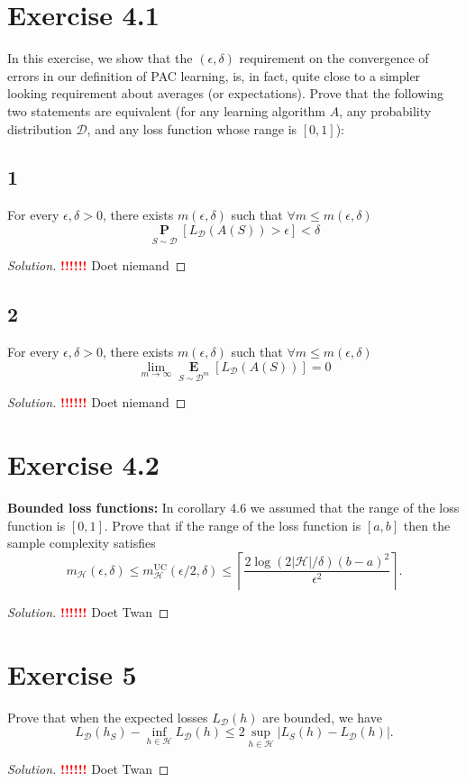 \documentclass[10pt, a4paper, twoside]{amsart}
\renewcommand{\P}{\operatorname*{\ensuremath{\mathbf{P}}}}
\newcommand{\Ev}{\operatorname*{\ensuremath{\mathbf{E}}}}
\newenvironment{solution}
               {\let\oldqedsymbol=\qedsymbol
                \renewcommand{\qedsymbol}{$\blacktriangleleft$}
                \begin{proof}[Solution]}
               {\end{proof}
                \renewcommand{\qedsymbol}{\oldqedsymbol}}
\newcommand{\TODO}{\textcolor{red}{\textbf{!!!!!! }}}
\begin{document}
\section*{Exercise 4.1}
In this exercise, we show that the $(\epsilon , \delta )$ requirement on the convergence of errors in our definition of PAC learning, is, in fact, quite close to a simpler looking requirement about averages (or expectations). Prove that the following two statements are equivalent (for any learning algorithm $A$, any probability distribution $\mathcal{D}$, and any loss function whose range is $[0,1]$):
\subsection*{1}
For every $\epsilon , \delta > 0$, there exists $m(\epsilon , \delta)$ such that $\forall m \leq m(\epsilon , \delta)$
\begin{equation*}
\P_{S \sim \mathcal{D}}[L_{\mathcal{D}}(A(S))>\epsilon]<\delta
\end{equation*}
\begin{solution}
  \TODO Doet niemand
\end{solution}

\subsection*{2}
For every $\epsilon , \delta > 0$, there exists $m(\epsilon , \delta)$ such that $\forall m \leq m(\epsilon , \delta)$
\begin{equation*}
\lim_{m\to \infty}\Ev_{S\sim \mathcal{D}^{m}}[L_{\mathcal{D}}(A(S))] =0
\end{equation*}
\begin{solution}
  \TODO Doet niemand
\end{solution}

\section*{Exercise 4.2}
\textbf{Bounded loss functions:}
In corollary 4.6 we assumed that the range of the loss function is $[0,1]$. Prove that if the range of the loss function is $[a,b]$ then the sample complexity satisfies
\begin{equation*}
  m_{\mathcal{H}}(\epsilon , \delta) \leq m_{\mathcal{H}}^{\text{UC}}(\epsilon /2, \delta)
  \leq \left\lceil \frac{2\log (2|\mathcal{H}|/\delta) (b-a)^2}{\epsilon^2} \right\rceil .
\end{equation*}
\begin{solution}
  \TODO Doet Twan
\end{solution}

\section*{Exercise 5}
Prove that when the expected losses $L_{\mathcal{D}}(h)$ are bounded, we have
\begin{equation*}
  L_{\mathcal{D}}(h_S) - \inf_{h\in \mathcal{H}}L_{\mathcal{D}}(h)
  \leq 2 \sup_{h\in \mathcal{H}}|L_S(h)-L_{\mathcal{D}}(h)|.
\end{equation*}
\begin{solution}
    \TODO Doet Twan
\end{solution}
\end{document}
